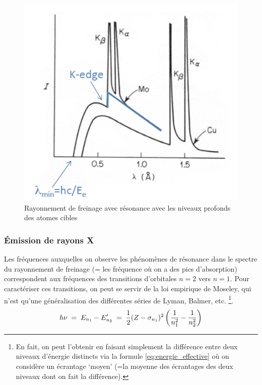 \begin{figure}[tph]
    \centering
    \includegraphics[scale=1.0]{Images2/RayonnementFreinage.PNG}
    \caption{Rayonnement de freinage avec résonance avec les niveaux profonds des atomes cibles}
    \label{fig:Rayonnement freinage}
\end{figure}


\subsubsection{Émission de rayons X}
Les fréquences auxquelles on observe les phénomènes de résonance dans le spectre du rayonnement de freinage (= les fréquence où on a des pics d'absorption) correspondent aux fréquences des transitions d'orbitales $n = 2$ vers $n = 1$. Pour caractériser ces transitions, on peut se servir de la loi empirique de Moseley, qui n'est qu'une généralisation des différentes séries de Lyman, Balmer, etc. \footnote{En fait, on peut l'obtenir en faisant simplement la différence entre deux niveaux d'énergie distincts via la formule \ref{eq:energie_effective} où on considère un écrantage `moyen' (=la moyenne des écrantages des deux niveaux dont on fait la différence).}.
\begin{equation}
    h\nu
    \; = \; E_{n_1} - E'_{n_2}
    \; = \; \dfrac{1}{2}(Z-\sigma_{n_1})^2\left(\dfrac{1}{n_1^2}-\dfrac{1}{n_2^2}\right)
    \label{eq:Moseley}
\end{equation}

